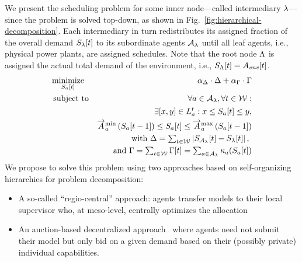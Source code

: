 \documentclass[conference]{IEEEtran}
\newcommand{\fref}[1]{Fig.~\ref{#1}}
\begin{document}
We present the scheduling problem for some inner node---called intermediary $\lambda$---since the problem is solved top-down, as shown in 
\fref{fig:hierarchical-decomposition}.
Each intermediary in turn redistributes its assigned fraction of the overall demand $S_{\lambda}[t]$ to 
its subordinate agents ${\mathcal{A}_{\lambda}}$ until all leaf agents, i.e., physical power plants, are assigned schedules. Note
that the root node $\Lambda$ is assigned the actual total demand of the environment, i.e., $S_{\Lambda}[t] = A_{\textit{env}}[t]$.
%
\begin{eqnarray}
\label{eq:csop-scheduling-hierarchy} \textstyle
		& \underset{\AgentPower{t}{\AnAgent}}{\operatorname{minimize}} & 
		\alpha_{\ViolationObjective} \cdot \ViolationObjective + \alpha_{\CostsObjective} \cdot \CostsObjective \\
		& \operatorname{subject\ to} & \forall a \in \Subsystem, \forall t \in \Horizon : \nonumber \\
		& & \exists [x , y] \in \ListProduction{t}\AnAgent : x \leq \AgentPower{t}{\AnAgent} \leq y\text{,} \nonumber \\
		& & \ChangeSpeedMin\AnAgent \left(\AgentPower{t-1}\AnAgent\right) \leq \AgentPower{t}{\AnAgent} \leq \ChangeSpeedMax\AnAgent\left(\AgentPower{t-1}\AnAgent\right) \nonumber\\
		& & \textstyle \text{with } \ViolationObjective = \sum_{t \in \Horizon} \left|\Production_\Subsystem[t] - \AssResidualLoad{t}{\AnAvpp} \right| \text{, } \nonumber \\
		& & \textstyle \text{and } 
		\CostsObjective = \sum_{t \in \Horizon} \CostsObjective[t] = \sum_{a \in \Subsystem} \CostFunction\AnAgent{\AgentPower{t}{\AnAgent}} \nonumber
\end{eqnarray}
%
We propose to solve this problem using two approaches based on self-organizing hierarchies
for problem decomposition:
\begin{itemize}
\item A so-called ``regio-central'' approach: agents transfer models to their local supervisor who, at meso-level,
centrally optimizes the allocation~\cite{Schiendorfer2014, SchiendorferSyn2014}
\item An auction-based decentralized approach~\cite{Anders-TAAS-2015} where agents need not submit their model
but only bid on a given demand based on their (possibly private) individual capabilities.
\end{itemize}
\end{document}
